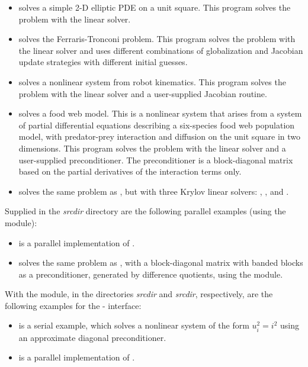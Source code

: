 \begin{itemize}
\item {}
  solves a simple 2-D elliptic PDE on a unit square.
 \newline
  This program solves the problem with the {\kinband} linear solver.
\item {}
  solves the Ferraris-Tronconi problem.
  \newline
  This program solves the problem with the {\kindense} linear solver
  and uses different combinations of globalization and Jacobian
  update strategies with different initial guesses.
\item {}
  solves a nonlinear system from robot kinematics.
  \newline
  This program solves the problem with the {\kindense} linear solver
  and a user-supplied Jacobian routine.
\item {}
  solves a food web model.
  \newline
  This is a nonlinear system that arises from a system of partial
  differential equations describing a six-species food web population
  model, with predator-prey interaction and diffusion on the unit
  square in two dimensions.
  This program solves the problem with the {\kinspgmr} linear solver
  and a user-supplied preconditioner. The preconditioner is a
  block-diagonal matrix based on the partial derivatives of the
  interaction terms only.
\item {}
  solves the same problem as , but with three Krylov
  linear solvers: , , and .
\end{itemize}

\vspace{0.2in}\noindent
Supplied in the {\em srcdir} directory are
the following parallel examples (using the {\nvecp} module):
\begin{itemize}
\item {}
  is a parallel implementation of .
\item {}
  solves the same problem as , with a block-diagonal matrix
  with banded blocks as a preconditioner, generated by difference quotients,
  using the {\kinbbdpre} module.
\end{itemize}

\vspace{0.2in}\noindent
With the {\fkinsol} module, in the directories 
{\em srcdir} and
{\em srcdir}, respectively, are the
following examples for the {\F}-{\C} interface:
\begin{itemize}
\item {}
  is a serial example, which solves a nonlinear system of the form
  $u_i^2 = i^2$ using an approximate diagonal preconditioner.
\item {}
  is a parallel implementation of .
\end{itemize}

